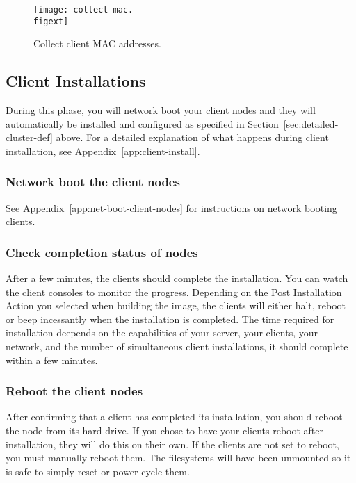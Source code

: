 \begin{figure}[htbp]
  \begin{center}
    \texttt{[image: collect-mac.\\figext]}
    \caption{Collect client MAC addresses.}
    \label{fig:detailed-collect-mac}
  \end{center}
\end{figure}


\subsection{Client Installations}
\label{det:clientinstall}

During this phase, you will network boot your client nodes and they
will automatically be installed and configured as specified in
Section~\ref{sec:detailed-cluster-def} above. For a detailed
explanation of what happens during client installation, see
Appendix~\ref{app:client-install}.

\subsubsection{Network boot the client nodes}

See Appendix~\ref{app:net-boot-client-nodes} for instructions on
network booting clients.

\subsubsection{Check completion status of nodes}
\label{det:clientfinish}

After a few minutes, the clients should complete the installation.
You can watch the client consoles to monitor the progress. Depending
on the Post Installation Action you selected when building the image,
the clients will either halt, reboot or beep incessantly when the 
installation is completed. 
The time required for installation deepends on the capabilities of
your server, your clients, your network, and the number of simultaneous 
client installations, it should complete within a few minutes.
  
\subsubsection{Reboot the client nodes}

After confirming that a client has completed its installation, you
should reboot the node from its hard drive. If you chose to have your
clients reboot after installation, they will do this on their
own. If the clients are not set to reboot, you must manually
reboot them. The filesystems will have been unmounted so it is safe
to simply reset or power cycle them.

